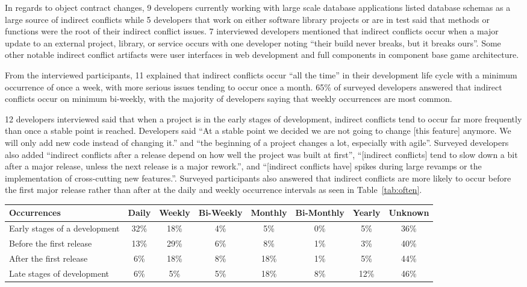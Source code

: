\documentclass[conference]{IEEEtran}
\begin{document}
In regards to object contract changes, 9 developers currently working with large scale database applications listed database
schemas as a large source of indirect conflicts while 5 developers that work on either software
library projects or are in test said that methods or functions were the root of their indirect conflict issues. 
7 interviewed developers mentioned that indirect conflicts occur when a major update to an external project, 
library, or service occurs with one developer noting ``their build never breaks, but it breaks ours''. Some
other notable indirect conflict artifacts were user interfaces in web development and full components in component 
base game architecture. 

From the interviewed participants, 11 explained that indirect conflicts occur ``all the time'' in
their development life cycle with a minimum occurrence of once a week, with more serious issues tending
to occur once a month. 65\% of surveyed developers answered that indirect conflicts occur on minimum bi-weekly,
with the majority of developers saying that weekly occurrences are most common.  

12 developers interviewed said that
when a project is in the early stages of development, indirect conflicts tend to occur far more frequently
than once a stable point is reached. Developers said ``At a stable point we decided we are not going to change
[this feature] anymore. We will only add new code instead of changing it.'' and ``the beginning of a project 
changes a lot, especially with agile''. Surveyed developers also added ``indirect conflicts after a release 
depend on how well the project was built at first'', ``[indirect conflicts] tend to slow down a bit after a 
major release, unless the next release is a major rework.'', and ``[indirect conflicts have] spikes during 
large revamps or the implementation of cross-cutting new features.''. Surveyed participants also answered that 
indirect conflicts are more likely to occur before the first major release rather than after at the daily
and weekly occurrence intervals as seen in Table~\ref{tab:often}.

\begin{table*}[tb!]
\begin{center}
\begin{tabular}{| p{7cm} | c | c | c | c | c | c | c |}
\hline
Occurrences & Daily & Weekly & Bi-Weekly & Monthly & Bi-Monthly & Yearly & Unknown \\
\hline
\hline
Early stages of a development & 32\% & 18\% & 4\% & 5\% & 0\% & 5\% & 36\% \\ \hline
Before the first release & 13\% & 29\% & 6\% & 8\% & 1\% & 3\% & 40\% \\ \hline
After the first release & 6\% & 18\% & 8\% & 18\% & 1\% & 5\% & 44\% \\ \hline
Late stages of development & 6\% & 5\% & 5\% & 18\% & 8\% & 12\% & 46\% \\ \hline
\end{tabular}
\end{center}
\caption{Results of survey questions to how often indirect conflicts occur, in terms of percentage
of developers surveyed.\label{tab:often}}
\end{table*}
\end{document}
